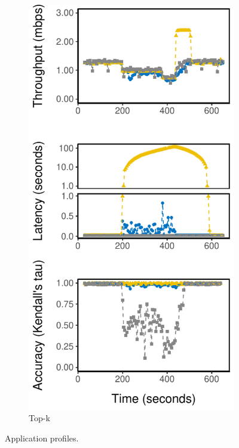 \begin{figure}[!htb]
\begin{subfigure}[t]{0.3\textwidth}
    \includegraphics[width=\textwidth]{figures/runtime-topk-verticle.pdf}
    \caption{Top-k}
    \label{fig:tk-runtime}
  \end{subfigure}
  \caption{Application profiles.}
  \label{fig:all-runtime}
\end{figure}

